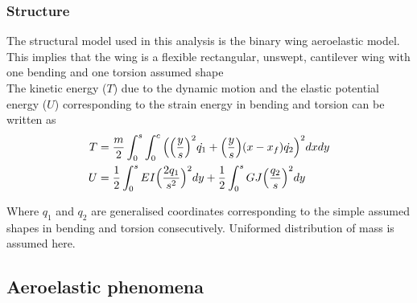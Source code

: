 \documentclass[11pt]{article}
\begin{document}
\subsubsection{Structure}
\label{sec:struc}
The structural model used in this analysis is the binary wing aeroelastic model. This implies that the wing is a flexible rectangular, unswept, cantilever wing with one bending and one torsion assumed shape \\

The kinetic energy ($T$) due to the dynamic motion and the elastic potential energy ($U$) corresponding to the strain energy in bending and torsion can be written as
\begin{align}
    T &= \frac{m}{2}\int_0^s \int_0^c \Big( \Big{(} \frac{y}{s}\Big{)}^2\dot{q_1}+\Big{(}\frac{y}{s}\Big{)}(x-x_f)\dot{q_2}\Big{)}^2dxdy\\
    U &= \frac{1}{2}\int_0^s EI \Big{(}\frac{2q_1}{s^2}\Big{)}^2dy+\frac{1}{2}\int_0^sGJ\Big{(}\frac{q_2}{s}\Big{)}^2dy
\end{align}

Where $q_1$ and $q_2$ are generalised coordinates corresponding to the simple assumed shapes in bending and torsion consecutively. Uniformed distribution of mass is assumed here. 


\subsection{Aeroelastic phenomena}
\label{sec:aero-phe}

\end{document}
